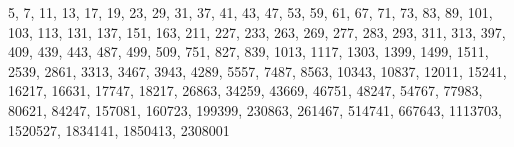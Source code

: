 5, 7, 11, 13, 17, 19, 23, 29, 31, 37, 41, 43, 47, 53, 59, 61, 67, 71, 73, 83, 89, 101, 103, 113, 131, 137, 151, 163, 211, 227, 233, 263, 269, 277, 283, 293, 311, 313, 397, 409, 439, 443, 487, 499, 509, 751, 827, 839, 1013, 1117, 1303, 1399, 1499, 1511, 2539, 2861, 3313, 3467, 3943, 4289, 5557, 7487, 8563, 10343, 10837, 12011, 15241, 16217, 16631, 17747, 18217, 26863, 34259, 43669, 46751, 48247, 54767, 77983, 80621, 84247, 157081, 160723, 199399, 230863, 261467, 514741, 667643, 1113703, 1520527, 1834141, 1850413, 2308001
